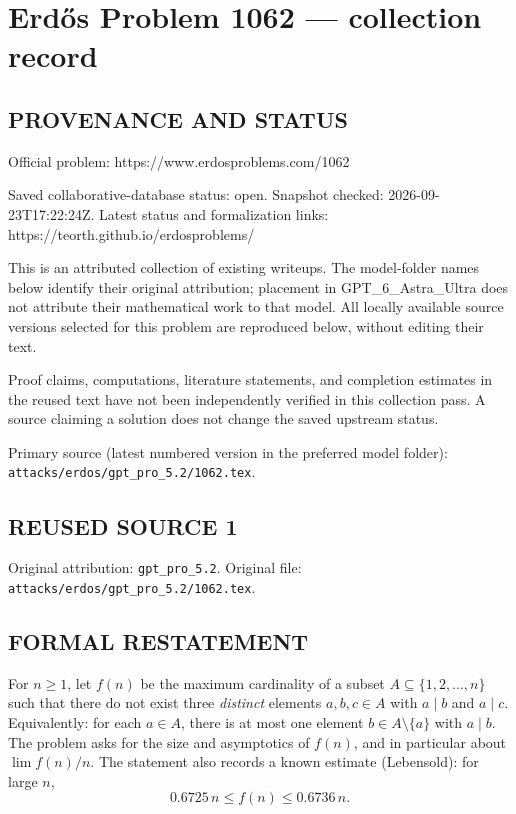 \section*{Erd\H{o}s Problem 1062 --- collection record}

\subsection*{PROVENANCE AND STATUS}
Official problem: https://www.erdosproblems.com/1062

Saved collaborative-database status: open.
Snapshot checked: 2026-09-23T17:22:24Z.
Latest status and formalization links: https://teorth.github.io/erdosproblems/

This is an attributed collection of existing writeups. The model-folder names below identify their original attribution; placement in GPT\_6\_Astra\_Ultra does not attribute their mathematical work to that model. All locally available source versions selected for this problem are reproduced below, without editing their text.

Proof claims, computations, literature statements, and completion estimates in the reused text have not been independently verified in this collection pass. A source claiming a solution does not change the saved upstream status.

Primary source (latest numbered version in the preferred model folder): \texttt{attacks/erdos/gpt\_pro\_5.2/1062.tex}.

\subsection*{REUSED SOURCE 1}
Original attribution: \texttt{gpt\_pro\_5.2}.
Original file: \texttt{attacks/erdos/gpt\_pro\_5.2/1062.tex}.


\subsection*{FORMAL RESTATEMENT}
For $n\ge 1$, let $f(n)$ be the maximum cardinality of a subset $A\subseteq\{1,2,\dots,n\}$ such that there do not exist three \emph{distinct} elements $a,b,c\in A$ with $a\mid b$ and $a\mid c$.
Equivalently: for each $a\in A$, there is at most one element $b\in A\setminus\{a\}$ with $a\mid b$.
The problem asks for the size and asymptotics of $f(n)$, and in particular about $\lim f(n)/n$.
The statement also records a known estimate (Lebensold): for large $n$,
\[
0.6725\,n\le f(n)\le 0.6736\,n.
\]

